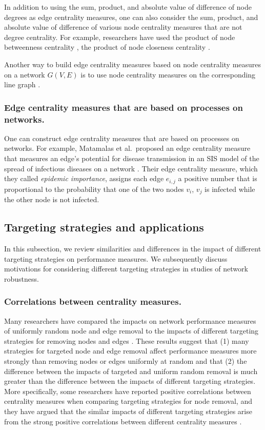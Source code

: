 \documentclass{comnet-mod}
\begin{document}
In addition to using the sum, product, and absolute value of difference of node degrees as edge centrality measures, one can also consider the sum, product, and absolute value of difference of various node centrality measures that are not degree centrality. For example, researchers have used the product of node betweenness centrality \cite{Zheng2014}, the product of node closeness centrality \cite{Hao2020}.

Another way to build edge centrality measures based on node centrality measures on a network $G(V,E)$ is to use node centrality measures on the corresponding line graph \cite{Brohl2019}. 

\subsubsection{Edge centrality measures that are based on processes on networks.}
One can construct edge centrality measures that are based on processes on networks. For example, Matamalas et al.~proposed an edge centrality measure that measures an edge's potential for disease transmission in an SIS model of the spread of infectious diseases on a network \cite{Matamalas2018}. Their  edge centrality measure, which they called \textit{epidemic importance}, assigns each edge $e_{i,j}$ a positive number that is proportional to the probability that one of the two nodes $v_i$, $v_j$ is infected while the other node is not infected. 


\subsection{Targeting strategies and applications}

In this subsection, we review similarities and differences in the impact of different targeting strategies on performance measures. We subsequently discuss motivations for considering different targeting strategies in studies of network robustness.


\subsubsection{Correlations between centrality measures.}


Many researchers have compared the impacts on network performance measures of uniformly random node and edge removal to the impacts of different targeting strategies for removing nodes and edges \cite{Motter2002, Herrmann2011, Hossain2013, Iyer2013, Lordan2014, Ventresca2014}. These results suggest that (1) many strategies for targeted node and edge removal affect performance measures more strongly than removing nodes or edges uniformly at random and that (2) the difference between the impacts of targeted and uniform random removal is much greater than the difference between the impacts of different targeting strategies. More specifically, some researchers have reported positive correlations between centrality measures when comparing targeting strategies for node removal, and they have argued that the similar impacts of different targeting strategies arise from the strong positive correlations between different centrality measures \cite{Holme2002, Iyer2013, Lordan2014}. 
\end{document}

